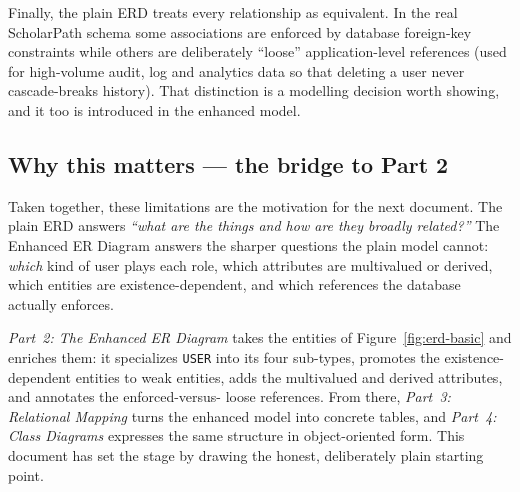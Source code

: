 \documentclass[11pt,a4paper]{article}
\begin{document}
Finally, the plain ERD treats every relationship as equivalent. In the real
ScholarPath schema some associations are enforced by database foreign-key
constraints while others are deliberately ``loose'' application-level
references (used for high-volume audit, log and analytics data so that deleting
a user never cascade-breaks history). That distinction is a modelling decision
worth showing, and it too is introduced in the enhanced model.

\subsection{Why this matters --- the bridge to Part 2}

Taken together, these limitations are the motivation for the next document. The
plain ERD answers \emph{``what are the things and how are they broadly
related?''} The Enhanced ER Diagram answers the sharper questions the plain
model cannot: \emph{which} kind of user plays each role, which attributes are
multivalued or derived, which entities are existence-dependent, and which
references the database actually enforces.

\emph{Part~2: The Enhanced ER Diagram} takes the entities of
Figure~\ref{fig:erd-basic} and enriches them: it specializes \texttt{USER} into
its four sub-types, promotes the existence-dependent entities to weak entities,
adds the multivalued and derived attributes, and annotates the enforced-versus-
loose references. From there, \emph{Part~3: Relational Mapping} turns the
enhanced model into concrete tables, and \emph{Part~4: Class Diagrams} expresses
the same structure in object-oriented form. This document has set the stage by
drawing the honest, deliberately plain starting point.
\end{document}
